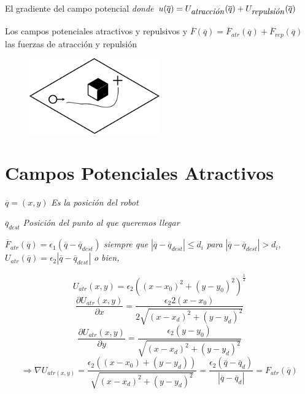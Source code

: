 El gradiente del campo potencial \hspace{1cm} \textit{donde}  $u(\overline{q}) = U_{\mbox{\textit{atracción}}}(\overline{q}) + U_{\mbox{\textit{repulsión}}}(\overline{q})$

Los campos potenciales atractivos y repulsivos y  $\overline{F}(\overline{q}) = \overline{F}_{atr}(\overline{q}) + \overline{F}_{rep}(\overline{q})$ las fuerzas de atracción y repulsión

\begin{figure}[h!]
	\centering
	\includegraphics[width=0.5\textwidth]{images/img14.png}
	\label{figura14}
\end{figure}



\section{Campos Potenciales Atractivos}

\begin{center}


$\overline{q} = (x,y)$ \textit{Es la posición del robot}

$\overline{q}_{dest} $ \textit{Posición del punto al que queremos llegar}

$\overline{F}_{atr}(\overline{q}) = \epsilon_{1} (\overline{q} - \overline{q}_{dest})$ \textit{siempre que} $\left| \overline{q} - \overline{q}_{dest} \right| \leq d_{i}$ \textit{para} $\left| \overline{q} - \overline{q}_{dest} \right| > d_{i}$, $U_{atr}(\overline{q}) = \epsilon_{2} \left| \overline{q} - \overline{q}_{dest} \right|$ \textit{o bien,} 
\end{center}

$$U_{atr}(x,y) = \epsilon_{2} \left( (x - x_{0})^2 + (y - y_{0})^2 \right)^\frac{1}{2}$$
$$\dfrac{\partial U_{atr}(x,y)}{\partial x} = \dfrac{\epsilon_{2}2(x - x_{0})}{2\sqrt{(x - x_{d})^2 + (y - y_{d})^2}}$$
$$\dfrac{\partial U_{atr}(x,y)}{\partial y} = \dfrac{\epsilon_{2}(y - y_{0})}{\sqrt{(x - x_{d})^2 + (y - y_{d})^2}}$$
$$\Rightarrow \nabla U_{atr(x,y)} = \dfrac{\epsilon_{2}\left( (x - x_{0}) + (y - y_{d})\right) }{\sqrt{(x - x_{d})^2 + (y - y_{d})^2}} = \dfrac{\epsilon_{2}(\overline{q} - \overline{q}_d)}{\left| \overline{q} - \overline{q}_{d} \right|} = F_{atr}(\overline{q})$$



